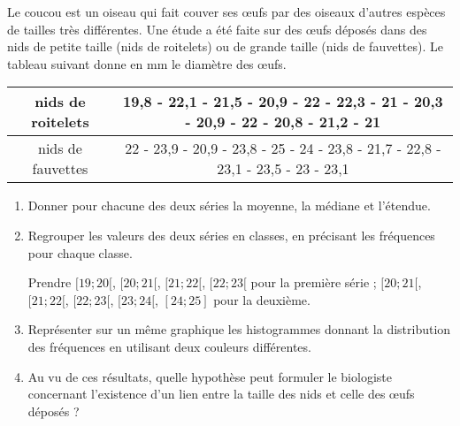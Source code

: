 
Le coucou est un oiseau qui fait couver ses œufs par des oiseaux d'autres espèces de tailles très
différentes. Une étude a été faite sur des œufs déposés dans des nids de petite taille (nids de roitelets)
ou de grande taille (nids de fauvettes).
Le tableau suivant donne en mm le diamètre des œufs.

\begin{tabular}{|c|c|}
\hline 
nids de roitelets & 19,8 - 22,1 - 21,5 - 20,9 - 22 - 22,3 - 21 - 20,3 - 20,9 - 22 - 20,8 - 21,2 - 21 \\ 
\hline 
nids de fauvettes & 22 - 23,9 - 20,9 - 23,8 - 25 - 24 - 23,8 - 21,7 - 22,8 - 23,1 - 23,5 - 23 - 23,1 \\ 
\hline 
\end{tabular} 


\begin{enumerate}
\item Donner pour chacune des deux séries la moyenne, la médiane et l'étendue.
\item  Regrouper les valeurs des deux séries en classes, en précisant les fréquences pour chaque classe.

Prendre $[19 ; 20[$, $[20 ; 21[$, $[21 ; 22[$, $[22 ; 23[$ pour la première série ; $[20 ; 21[$, $[21 ; 22[$,
$[22 ; 23[$, $[23 ; 24[$, $[24 ; 25]$ pour la deuxième.
\item  Représenter sur un même graphique les histogrammes donnant la distribution des fréquences en
utilisant deux couleurs différentes.
\item  Au vu de ces résultats, quelle hypothèse peut formuler le biologiste concernant l'existence d'un lien
entre la taille des nids et celle des œufs déposés ?\end{enumerate}